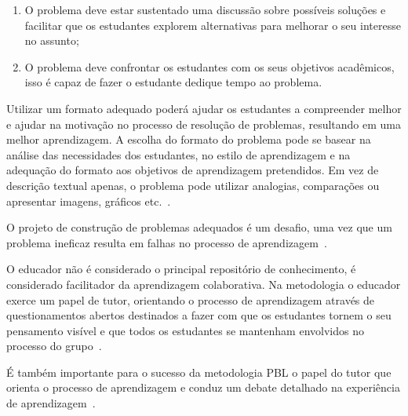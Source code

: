 \begin{enumerate}
{para não prejudicar os estudantes na
autoaprendizagem;}
\item{O problema deve estar sustentado uma discussão
sobre possíveis soluções e facilitar que os estudantes
explorem alternativas para melhorar o seu interesse
no assunto;}
\item{O problema deve confrontar os estudantes com
os seus objetivos acadêmicos, isso é capaz de
fazer o estudante dedique tempo ao problema.}
\end{enumerate}

Utilizar um formato adequado poderá ajudar os estudantes
a compreender melhor e ajudar na motivação no processo
de resolução de problemas, resultando em uma
melhor aprendizagem.
A escolha do formato do problema pode se basear na análise
das necessidades dos estudantes, no estilo de aprendizagem
e na adequação do formato aos objetivos de
aprendizagem pretendidos.
Em vez de descrição textual apenas, o problema pode
utilizar analogias, comparações ou apresentar imagens,
gráficos etc.~\cite{sockalingam2011student}.

O projeto de construção de problemas adequados é um desafio, uma
vez que um problema ineficaz resulta em falhas no processo de
aprendizagem~\cite{azer2012twelve,amos1998problem,
des1999delphi,kukkamalla2011designing}.


O educador não é considerado o principal repositório
de conhecimento, é considerado facilitador da aprendizagem
colaborativa.
Na metodologia o educador exerce um papel de tutor, orientando
o processo de aprendizagem através de questionamentos abertos
destinados a fazer com que os estudantes tornem o seu pensamento
visível e que todos os estudantes se mantenham envolvidos
no processo do grupo~\cite{hmelo2004problem}.

É também importante para o sucesso da metodologia \ac{PBL} o
papel do tutor que orienta o processo de aprendizagem
e conduz um debate detalhado na experiência de
aprendizagem~\cite{savery2015overview}.

